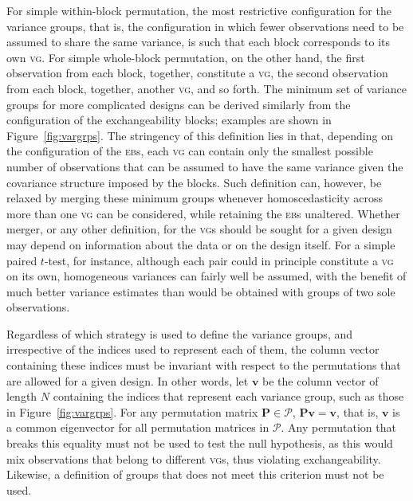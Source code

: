 For simple within-block permutation, the most restrictive configuration for the variance groups, that is, the configuration in which fewer observations need to be assumed to share the same variance, is such that each block corresponds to its own \textsc{vg}. For simple whole-block permutation, on the other hand, the first observation from each block, together, constitute a \textsc{vg}, the second observation from each block, together, another \textsc{vg}, and so forth. The minimum set of variance groups for more complicated designs can be derived similarly from the configuration of the exchangeability blocks; examples are shown in Figure~\ref{fig:vargrps}. The stringency of this definition lies in that, depending on the configuration of the \textsc{eb}s, each \textsc{vg} can contain only the smallest possible number of observations that can be assumed to have the same variance given the covariance structure imposed by the blocks. Such definition can, however, be relaxed by merging these minimum groups whenever homoscedasticity across more than one \textsc{vg} can be considered, while retaining the \textsc{eb}s unaltered. Whether merger, or any other definition, for the \textsc{vg}s should be sought for a given design may depend on information about the data or on the design itself. For a simple paired $t$-test, for instance, although each pair could in principle constitute a \textsc{vg} on its own, homogeneous variances can fairly well be assumed, with the benefit of much better variance estimates than would be obtained with groups of two sole observations.

Regardless of which strategy is used to define the variance groups, and irrespective of the indices used to represent each of them, the column vector containing these indices must be invariant with respect to the permutations that are allowed for a given design. In other words, let $\mathbf{v}$ be the column vector of length $N$ containing the indices that represent each variance group, such as those in Figure~\ref{fig:vargrps}. For any permutation matrix $\mathbf{P} \in \mathcal{P}$, $\mathbf{P}\mathbf{v}=\mathbf{v}$, that is, $\mathbf{v}$ is a common eigenvector for all permutation matrices in  $\mathcal{P}$. Any permutation that breaks this equality must not be used to test the null hypothesis, as this would mix observations that belong to different \textsc{vg}s, thus violating exchangeability. Likewise, a definition of groups that does not meet this criterion must not be used.

